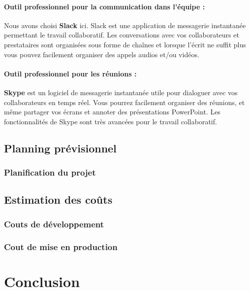 \paragraph{Outil professionnel pour la communication dans l’équipe : } Nous avons choisi \textbf{Slack} ici. Slack est une application de messagerie instantanée permettant le travail collaboratif. Les conversations avec vos collaborateurs et prestataires sont organisées sous forme de chaînes et lorsque l’écrit ne suffit plus vous pouvez facilement organiser des appels audios et/ou vidéos.
 \paragraph{Outil professionnel pour les réunions : } \textbf{Skype} est un logiciel de messagerie instantanée utile pour dialoguer avec vos collaborateurs en temps réel. Vous pourrez facilement organiser des réunions, et même partager vos écrans et annoter des présentations PowerPoint. Les fonctionnalités de Skype sont très avancées pour le travail collaboratif.
\subsection{Planning prévisionnel}
\subsubsection{Planification du projet}
\blindtext

\subsection{Estimation des coûts}
\blindtext

\subsubsection{Couts de développement}
\blindtext

\subsubsection{Cout de mise en production}
\blindtext



\section*{Conclusion}%
%
\blindtext
